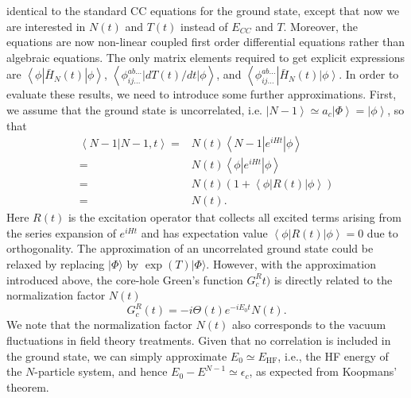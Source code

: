 \documentclass[aps,prb,twocolumn,groupaddress,floatfix]{revtex4}
\begin{document}
identical to the standard CC equations for the ground state,\cite{crawford2000introduction}
 except that now we are interested in $N(t)$ and $T(t)$ instead of $E_{CC}$
and $T$. Moreover, the equations are now non-linear coupled  first order 
differential equations rather than algebraic equations. The only
matrix elements required to get explicit
expressions are $\left< \phi \left| \bar{H}_N(t) \right| \phi \right>$,
$\left< \phi_{ij...}^{ab...} \left| {d T(t)}/{dt} \right| \phi \right>$,
and $\left< \phi_{ij...}^{ab...} \right| \bar{H}_N(t) \left| \phi \right>$.
In order to evaluate these results,
we need to introduce some further approximations.
First, we assume that the ground state is uncorrelated, i.e.
$\left| N-1 \right> \simeq a_c \left| \Phi \right> = \left| \phi \right>$,
so that
\begin{equation}
\begin{split}
\left<N-1\right| \left. N-1, t \right> =&
N(t) \left<N-1\left| e^{iHt}\right| \phi \right> \\
=&N(t) \left< \phi \left| e^{iHt}\right| \phi \right> \\
=&N(t) \left( 1+ \left< \phi \left| R(t) \right| \phi \right> \right) \\
=&N(t).
\end{split}
\end{equation}
Here $R(t)$ is the excitation operator that collects all excited terms arising from the series expansion of $e^{iHt}$ and has expectation value $\left< \phi \left| R(t) \right| \phi \right> = 0$ due to orthogonality.
The approximation of an uncorrelated ground state
could be relaxed by replacing $|\Phi\rangle$ by $\exp(T)|\Phi\rangle$.
However, with the approximation introduced above, 
the core-hole Green's function $G_c^Rt)$ 
is directly related to the normalization factor $N(t)$
\begin{equation}
G_{c}^{R}(t) =
-i \Theta(t) e^{-iE_0t}N(t).
\end{equation}
We note that the normalization factor $N(t)$ also corresponds to
the vacuum fluctuations in field theory treatments.\cite{NozieresDeDominicis}
Given that no correlation is included
in the ground state, we can simply approximate $E_0 
\simeq E_\mathrm{HF}$, i.e., the HF energy of the $N$-particle system,
and hence $E_0-E^{N-1} \simeq \epsilon_c$, as expected
from Koopmans' theorem.
\end{document}
